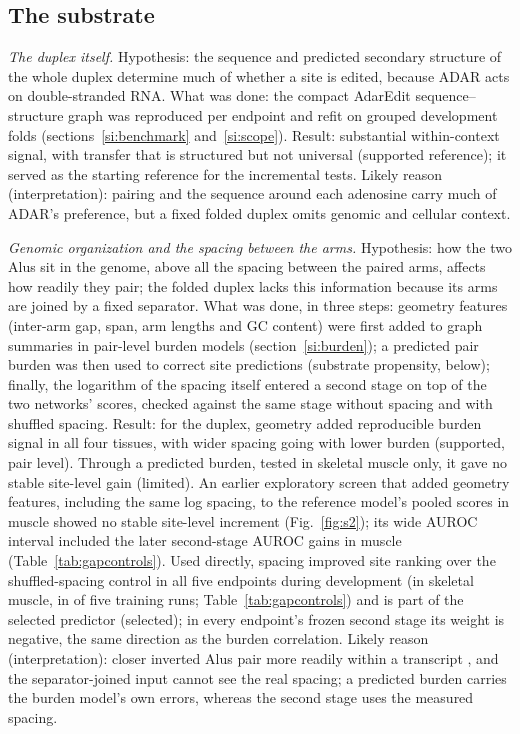 \documentclass[9pt,twoside]{pnas-new}
\begin{document}
\subsection*{The substrate}

\textit{The duplex itself.} Hypothesis: the sequence and predicted secondary structure of the whole duplex determine much of whether a site is edited, because ADAR acts on double-stranded RNA. What was done: the compact AdarEdit sequence--structure graph was reproduced per endpoint and refit on grouped development folds (sections~\ref{si:benchmark} and~\ref{si:scope}). Result: substantial within-context signal, with transfer that is structured but not universal (supported reference); it served as the starting reference for the incremental tests. Likely reason (interpretation): pairing and the sequence around each adenosine carry much of ADAR's preference, but a fixed folded duplex omits genomic and cellular context.

\textit{Genomic organization and the spacing between the arms.} Hypothesis: how the two Alus sit in the genome, above all the spacing between the paired arms, affects how readily they pair; the folded duplex lacks this information because its arms are joined by a fixed separator. What was done, in three steps: geometry features (inter-arm gap, span, arm lengths and GC content) were first added to graph summaries in pair-level burden models (section~\ref{si:burden}); a predicted pair burden was then used to correct site predictions (substrate propensity, below); finally, the logarithm of the spacing itself entered a second stage on top of the two networks' scores, checked against the same stage without spacing and with shuffled spacing. Result: for the duplex, geometry added reproducible burden signal in all four tissues, with wider spacing going with lower burden (supported, pair level). Through a predicted burden, tested in skeletal muscle only, it gave no stable site-level gain (limited). An earlier exploratory screen that added geometry features, including the same log spacing, to the reference model's pooled scores in muscle showed no stable site-level increment (Fig.~\ref{fig:s2}); its wide AUROC interval included the later second-stage AUROC gains in muscle (Table~\ref{tab:gapcontrols}). Used directly, spacing improved site ranking over the shuffled-spacing control in all five endpoints during development (in skeletal muscle, in \GapRunsMuscleVsShuffledAUROCExcl{} of five training runs; Table~\ref{tab:gapcontrols}) and is part of the selected predictor (selected); in every endpoint's frozen second stage its weight is negative, the same direction as the burden correlation. Likely reason (interpretation): closer inverted Alus pair more readily within a transcript \cite{Bazak2014Editability}, and the separator-joined input cannot see the real spacing; a predicted burden carries the burden model's own errors, whereas the second stage uses the measured spacing.
\end{document}
